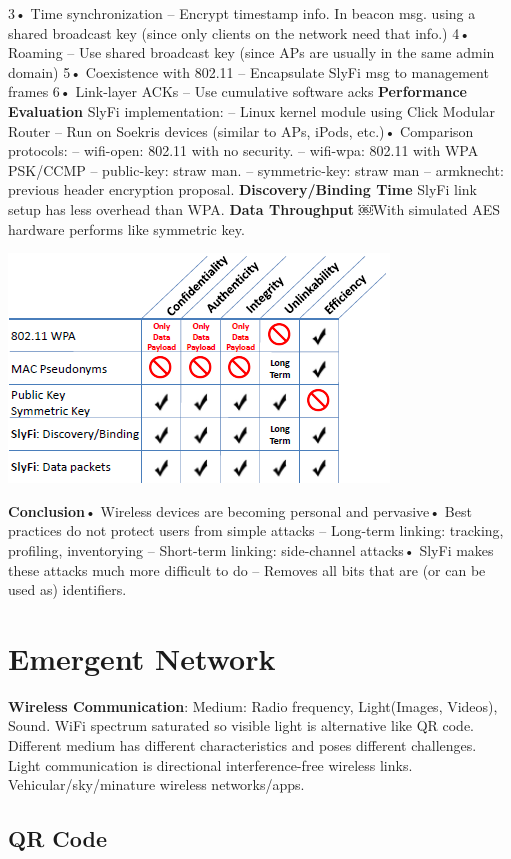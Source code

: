 \documentclass[9pt]{extarticle}
\begin{document}
\begin{multicols}{2}
3• Time synchronization – Encrypt timestamp info. In beacon msg. using a shared broadcast key (since only clients on the network need that info.) 4• Roaming – Use shared broadcast key (since APs are usually in the same admin domain) 5• Coexistence with 802.11 – Encapsulate SlyFi msg to management frames 6• Link-layer ACKs – Use cumulative software acks \textbf{Performance Evaluation} SlyFi implementation: – Linux kernel module using Click Modular Router – Run on Soekris devices (similar to APs, iPods, etc.)• Comparison protocols: – wifi-open: 802.11 with no security. – wifi-wpa: 802.11 with WPA PSK/CCMP – public-key: straw man. – symmetric-key: straw man – armknecht: previous header encryption proposal. \textbf{Discovery/Binding Time} SlyFi link setup has less overhead than WPA. \textbf{Data Throughput} ￼With simulated AES hardware performs like symmetric key. 

\includegraphics{slyfi.png}

\textbf{Conclusion}• Wireless devices are becoming personal and pervasive• Best practices do not protect users from simple attacks – Long-term linking: tracking, profiling, inventorying – Short-term linking: side-channel attacks• SlyFi makes these attacks much more difficult to do – Removes all bits that are (or can be used as) identifiers.

\section{Emergent Network}

\textbf{Wireless Communication}: Medium: Radio frequency, Light(Images, Videos), Sound. WiFi spectrum saturated so visible light is alternative like QR code. Different medium has different characteristics and poses different challenges. Light communication is directional interference-free wireless links. Vehicular/sky/minature wireless networks/apps.

\subsection{QR Code}


\end{multicols}
\end{document}
